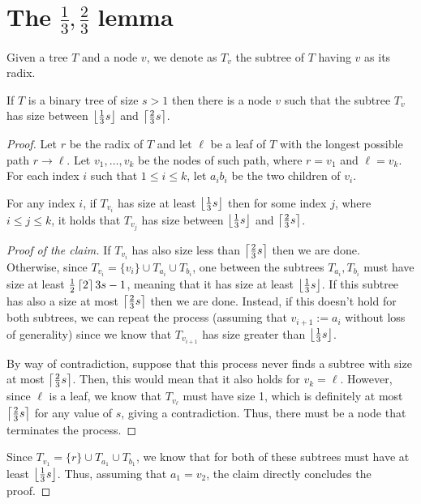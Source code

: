 \newpage




\section{The $\frac{1}{3}, \frac{2}{3}$ lemma}

\begin{definition}
    Given a tree $T$ and a node $v$, we denote as $T_v$ the subtree of $T$ having $v$ as its radix. 
\end{definition}

\begin{lemma}
    \label{13_23_lewis}
    If $T$ is a binary tree of size $s > 1$ then there is a node $v$ such that the subtree $T_v$ has size between $\left \lfloor \frac{1}{3} s \right \rfloor$ and $\left \lceil \frac{2}{3} s \right \rceil$.
\end{lemma}

\begin{proof}
    Let $r$ be the radix of $T$ and let $\ell$ be a leaf of $T$ with the longest possible path $r \to \ell$. Let $v_1, \ldots, v_k$ be the nodes of such path, where $r = v_1$ and $\ell = v_k$. For each index $i$ such that $1 \leq i \leq k$, let $a_i b_i$ be the two children of $v_i$.

    \begin{claimlemma}
        For any index $i$, if $T_{v_i}$ has size at least $\left \lfloor \frac{1}{3} s \right \rfloor$ then for some index $j$, where $i \leq j \leq k$, it holds that $T_{v_j}$ has size between $\left \lfloor \frac{1}{3} s \right \rfloor$ and $\left \lceil \frac{2}{3} s \right \rceil$.
    \end{claimlemma}

    \begin{proof}[Proof of the claim]
        If $T_{v_i}$ has also size less than $\left \lceil \frac{2}{3} s \right \rceil$ then we are done. Otherwise, since $T_{v_i} = \{v_i\} \cup T_{a_i} \cup T_{b_i}$, one between the subtrees $T_{a_i}, T_{b_i}$ must have size at least $\frac{1}{2} \left \lceil 2 \right \rceil{3} s - 1$, meaning that it has size at least $\left \lfloor \frac{1}{3} s \right \rfloor$. If this subtree has also a size at most $\left \lceil \frac{2}{3} s \right \rceil$ then we are done. Instead, if this doesn't hold for both subtrees, we can repeat the process (assuming that $v_{i+1} := a_i$ without loss of generality) since we know that $T_{v_{i+1}}$ has size greater than $\left \lfloor \frac{1}{3} s \right \rfloor$.

        By way of contradiction, suppose that this process never finds a subtree with size at most $\left \lceil \frac{2}{3} s \right \rceil$. Then, this would mean that it also holds for $v_k = \ell$. However, since $\ell$ is a leaf, we know that $T_{v_\ell}$ must have size 1, which is definitely at most $\left \lceil \frac{2}{3} s \right \rceil$ for any value of $s$, giving a contradiction. Thus, there must be a node that terminates the process.

    \end{proof}
    
    Since $T_{v_1} = \{r\} \cup T_{a_1} \cup T_{b_1}$, we know that for both of these subtrees must have at least $\left \lfloor \frac{1}{3} s \right \rfloor$. Thus, assuming that $a_1 = v_{2}$, the claim directly concludes the proof.
    
\end{proof}

